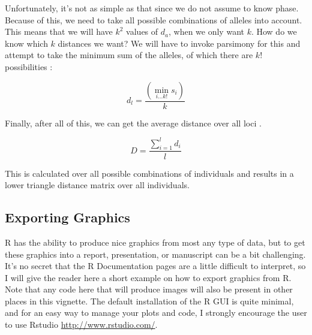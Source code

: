 \documentclass[letterpaper]{article}
\newcommand{\beq}{\begin{equation}}
\newcommand{\eeq}{\end{equation}}
\newcommand{\tab}{\hspace*{1em}}
\begin{document}
Unfortunately, it's not as simple as that since we do not assume to know phase. Because of this, we need to take all possible combinations of alleles into account. This means that we will have $k^2$ values of $d_a$, when we only want $k$. How do we know which $k$ distances we want? We will have to invoke parsimony for this and attempt to take the minimum sum of the alleles, of which there are $k!$ possibilities \cite{Bruvo:2004}:

\beq
\label{eq:d_l}
d_l = \frac{\left(\displaystyle \min_{i \dotsc k!} s_i\right)}{k}
\eeq

Finally, after all of this, we can get the average distance over all loci \cite{Bruvo:2004}. 

\beq
\label{eq:D}
D = \frac{\displaystyle \sum_{i=1}^l d_i}{l}
\eeq

This is calculated over all possible combinations of individuals and results in a lower triangle distance matrix over all individuals. 

\subsection{Exporting Graphics}\label{appendix:graphics}
\tab\tab R has the ability to produce nice graphics from most any type of data, but to get these graphics into a report, presentation, or manuscript can be a bit challenging. It's no secret that the R Documentation pages are a little difficult to interpret, so I will give the reader here a short example on how to export graphics from R. Note that any code here that will produce images will also be present in other places in this vignette. The default installation of the R GUI is quite minimal, and for an easy way to manage your plots and code, I strongly encourage the user to use Rstudio \url{http://www.rstudio.com/}.
\end{document}
